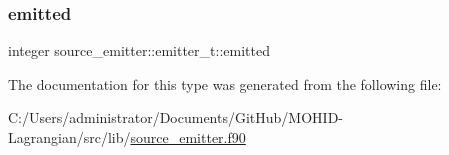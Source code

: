\mbox{\label{structsource__emitter_1_1emitter__t_a30062afe1a31dcfd77c90762d8c8cb5c}} 
\subsubsection{\texorpdfstring{emitted}{emitted}}
{\footnotesize\ttfamily integer source\+\_\+emitter\+::emitter\+\_\+t\+::emitted\hspace{0.3cm}{\ttfamily [private]}}



The documentation for this type was generated from the following file\+:\begin{DoxyCompactItemize}
\item 
C\+:/\+Users/administrator/\+Documents/\+Git\+Hub/\+M\+O\+H\+I\+D-\/\+Lagrangian/src/lib/\hyperlink{source__emitter_8f90}{source\+\_\+emitter.\+f90}\end{DoxyCompactItemize}
